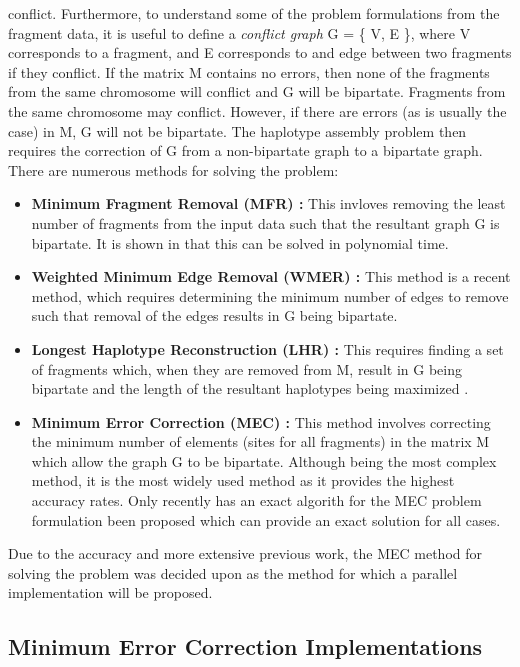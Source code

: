 \documentclass[10pt,twocolumn]{witseiepaper}
\begin{document}
conflict. Furthermore, to understand some of the problem formulations from the fragment data, it is useful to
define a \textit{conflict graph} \cite{lancia:2001} G = \{ V, E \}, where V corresponds to a fragment, and E
corresponds to and edge between two fragments if they conflict. If the matrix M contains no errors, then none
of the fragments from the same chromosome will conflict and G will be bipartate. Fragments from the same
chromosome may conflict. However, if there are errors (as is usually the case) in M, G will not be
bipartate. The haplotype assembly problem then requires the correction of G from a non-bipartate 
graph to a bipartate graph. There are numerous methods for solving the problem:

\begin{itemize}
    \item{ \textbf{Minimum Fragment Removal (MFR) :} This invloves removing the least number of fragments 
            from the input data such that the resultant graph G is bipartate. It is shown in 
            \cite{lancia:2001} that this can be solved in polynomial time.
        }
\item{ \textbf{Weighted Minimum Edge Removal (WMER) \cite{aguiar:2012} :} This method is a recent method,
        which requires determining the minimum number of edges to remove such that removal of the edges
        results in G being bipartate.
    }
\item{ \textbf{Longest Haplotype Reconstruction (LHR) :} This requires finding a set of fragments which,
        when they are removed from M, result in G being bipartate and the length of the resultant 
        haplotypes being maximized \cite{schwartz:2010}. 
    }
\item{ \textbf{Minimum Error Correction (MEC) :} This method involves correcting the minimum number of 
        elements (sites for all fragments) in the matrix M which allow the graph G to be bipartate. 
        Although being the most complex method, it is the most widely used method as it provides the 
        highest accuracy rates. Only recently has an exact algorith for the MEC problem formulation been
        proposed which can provide an exact solution for all cases.
    }
\end{itemize}

Due to the accuracy and more extensive previous work, the MEC method for solving the problem was decided upon
as the method for which a parallel implementation will be proposed.

\subsection{ Minimum Error Correction Implementations } \label{sec:mecimp}
\end{document}

